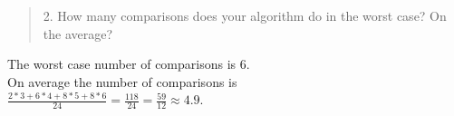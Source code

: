 \documentclass[12pt]{article}
\newenvironment{problem}[2][Problem]{\begin{trivlist}
\item[\hskip \labelsep {\bfseries #1}\hskip \labelsep {\bfseries #2.}]}{\end{trivlist}}
\begin{document}
\begin{problem}{(Decision Tree)}
\begin{tikzpicture}[>=stealth]
  \end{tikzpicture}

\begin{quote}
    2. How many comparisons does your algorithm do in the worst case? On the average?
\end{quote}
The worst case number of comparisons is 6.\\
On average the number of comparisons is\\
$\frac{2*3 + 6*4 + 8*5 + 8*6}{24} = \frac{118}{24} = \frac{59}{12} \approx 4.9$.

\end{problem}
\end{document}
